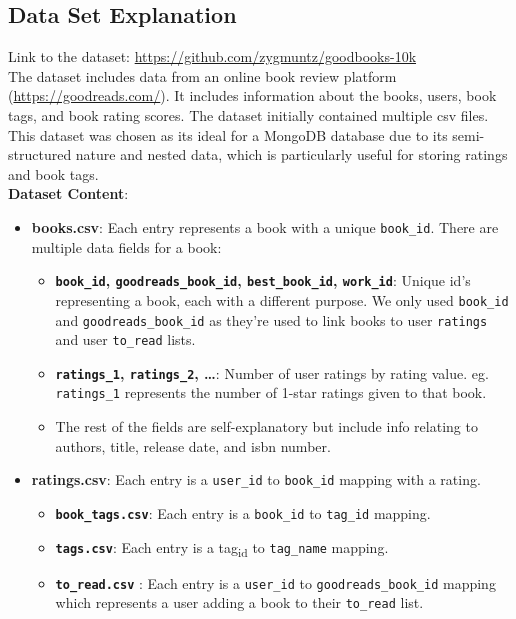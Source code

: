 \documentclass[11pt]{article}
\begin{document}
\subsection{Data Set Explanation}
\label{sec:orge51e814}
Link to the dataset: \url{https://github.com/zygmuntz/goodbooks-10k}\\
\linebreak
The dataset includes data from an online book review platform (\url{https://goodreads.com/}). It includes information about the books, users, book tags, and book rating scores. The dataset initially contained multiple csv files. This dataset was chosen as its ideal for a MongoDB database due to its semi-structured nature and nested data, which is particularly useful for storing ratings and book tags. \\
\linebreak
\textbf{Dataset Content}:
\begin{itemize}
\item \textbf{books.csv}: Each entry represents a book with a unique \texttt{book\_id}. There are multiple data fields for a book:
\begin{itemize}
\item \textbf{\texttt{book\_id}, \texttt{goodreads\_book\_id}, \texttt{best\_book\_id}, \texttt{work\_id}}: Unique id’s representing a book, each with a different purpose. We only used \texttt{book\_id} and \texttt{goodreads\_book\_id} as they’re used to link books to user \texttt{ratings} and user \texttt{to\_read} lists.
\item \textbf{\texttt{ratings\_1}, \texttt{ratings\_2}, …}: Number of user ratings by rating value. eg. \texttt{ratings\_1} represents the number of 1-star ratings given to that book.
\item The rest of the fields are self-explanatory but include info relating to authors, title, release date, and isbn number.
\end{itemize}
\item \textbf{ratings.csv}: Each entry is a \texttt{user\_id} to \texttt{book\_id} mapping with a rating.
\begin{itemize}
\item \textbf{\texttt{book\_tags.csv}}: Each entry is a \texttt{book\_id} to \texttt{tag\_id} mapping.
\item \textbf{\texttt{tags.csv}}: Each entry is a tag\textsubscript{id} to \texttt{tag\_name} mapping.
\item \textbf{\texttt{to\_read.csv}} : Each entry is a \texttt{user\_id} to \texttt{goodreads\_book\_id} mapping which represents a user adding a book to their \texttt{to\_read} list.
\end{itemize}
\end{itemize}
\end{document}
